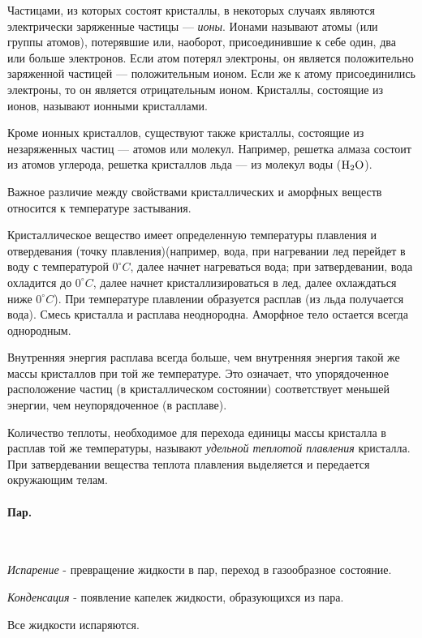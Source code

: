 \documentclass[a4paper,12pt]{article}
\begin{document}
		Частицами, из которых состоят кристаллы, в некоторых случаях являются электрически 
		заряженные частицы — \textit{ионы}. Ионами называют атомы (или группы атомов), потерявшие 
		или, наоборот, присоединившие к себе один, два или больше электронов. Если атом потерял 
		электроны, он является положительно заряженной частицей — положительным ионом. Если же 
		к атому присоединились электроны, то он является отрицательным ионом. Кристаллы, состоящие 
		из ионов, называют ионными кристаллами.

		Кроме ионных кристаллов, существуют также кристаллы, состоящие из незаряженных частиц — 
		атомов или молекул. Например, решетка алмаза состоит из атомов углерода, решетка кристаллов 
		льда — из молекул воды ($\ce{H2O}$).

		Важное различие между свойствами кристаллических и аморфных веществ относится к температуре 
		застывания.

		Кристаллическое вещество имеет определенную температуры плавления и отвердевания (точку 
		плавления)(например, вода, при нагревании лед перейдет в воду с температурой
		$0^\circ C$, далее начнет нагреваться вода; при затвердевании, вода охладится до $0^\circ C$,
		далее начнет кристаллизироваться в лед, далее охлаждаться ниже $0^\circ C$). 
		При температуре плавлении образуется расплав (из льда получается вода). Смесь кристалла и 
		расплава неоднородна. Аморфное тело остается всегда однородным.
		
		Внутренняя энергия расплава всегда больше, чем внутренняя энергия такой же массы кристаллов 
		при той же температуре. Это означает, что упорядоченное расположение частиц (в кристаллическом
		состоянии) соответствует меньшей энергии, чем неупорядоченное (в расплаве).

		Количество теплоты, необходимое для перехода единицы массы кристалла в расплав той же 
		температуры, называют \textit{удельной теплотой плавления} кристалла. При затвердевании 
		вещества теплота плавления выде­ляется и передается окружающим телам.

		\clearpage
		\paragraph{Пар.} \

		\textit{Испарение} - превращение жидкости в пар, переход в газообразное состояние.

		\textit{Конденсация} - появление капелек жидкости, образующихся из пара.

		Все жидкости испаряются.
\end{document}
